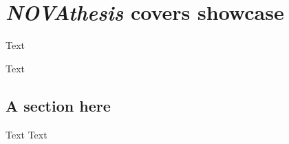 ﻿%

%

\chapter{\emph{NOVAthesis} covers showcase}
\label{app:covers_showcase}

Text

\newcommand{\showcasecoversize}{0.3\textwidth}
\newcommand*{\myhfill}{}
\newcommand{\myincludeimage}[1]{%
    \myhfill%
    \defifundef{\mycvbox}{\newsavebox}%
    \savebox{\mycvbox}{\texttt{[image: \#1]}}%
    \defifundef{\mycvboxht}{\newlength}%
    \setlength{\mycvboxht}{\dimexpr \showcasecoversize*\paperheight/\paperwidth}%
    \rule{0pt}{1.1\mycvboxht}%
    \setlength{\fboxsep}{0pt}%
    \fbox{\texttt{[image: \#1]}}%
    \renewcommand*{\myhfill}{\hfill}%
}


Text

\section{A section here}

Text
Text

